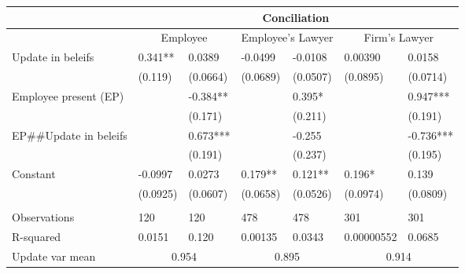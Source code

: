 \begin{tabular}{lcccccc}
      & \multicolumn{6}{c}{Conciliation } \\
\midrule
      & \multicolumn{2}{c}{Employee} & \multicolumn{2}{c}{Employee's Lawyer} & \multicolumn{2}{c}{Firm's Lawyer} \\
\midrule
\midrule
Update in beleifs & \multicolumn{1}{l}{0.341**} & \multicolumn{1}{l}{0.0389} & \multicolumn{1}{l}{-0.0499} & \multicolumn{1}{l}{-0.0108} & \multicolumn{1}{l}{0.00390} & \multicolumn{1}{l}{0.0158} \\
      & \multicolumn{1}{l}{(0.119)} & \multicolumn{1}{l}{(0.0664)} & \multicolumn{1}{l}{(0.0689)} & \multicolumn{1}{l}{(0.0507)} & \multicolumn{1}{l}{(0.0895)} & \multicolumn{1}{l}{(0.0714)} \\
Employee present (EP) & \multicolumn{1}{l}{} & \multicolumn{1}{l}{-0.384**} & \multicolumn{1}{l}{} & \multicolumn{1}{l}{0.395*} & \multicolumn{1}{l}{} & \multicolumn{1}{l}{0.947***} \\
      & \multicolumn{1}{l}{} & \multicolumn{1}{l}{(0.171)} & \multicolumn{1}{l}{} & \multicolumn{1}{l}{(0.211)} & \multicolumn{1}{l}{} & \multicolumn{1}{l}{(0.191)} \\
EP\#\#Update in beleifs & \multicolumn{1}{l}{} & \multicolumn{1}{l}{0.673***} & \multicolumn{1}{l}{} & \multicolumn{1}{l}{-0.255} & \multicolumn{1}{l}{} & \multicolumn{1}{l}{-0.736***} \\
      & \multicolumn{1}{l}{} & \multicolumn{1}{l}{(0.191)} & \multicolumn{1}{l}{} & \multicolumn{1}{l}{(0.237)} & \multicolumn{1}{l}{} & \multicolumn{1}{l}{(0.195)} \\
Constant  & \multicolumn{1}{l}{-0.0997} & \multicolumn{1}{l}{0.0273} & \multicolumn{1}{l}{0.179**} & \multicolumn{1}{l}{0.121**} & \multicolumn{1}{l}{0.196*} & \multicolumn{1}{l}{0.139} \\
      & \multicolumn{1}{l}{(0.0925)} & \multicolumn{1}{l}{(0.0607)} & \multicolumn{1}{l}{(0.0658)} & \multicolumn{1}{l}{(0.0526)} & \multicolumn{1}{l}{(0.0974)} & \multicolumn{1}{l}{(0.0809)} \\
      &       &       &       &       &       &  \\
\midrule
Observations & \multicolumn{1}{l}{120} & \multicolumn{1}{l}{120} & \multicolumn{1}{l}{478} & \multicolumn{1}{l}{478} & \multicolumn{1}{l}{301} & \multicolumn{1}{l}{301} \\
R-squared & \multicolumn{1}{l}{0.0151} & \multicolumn{1}{l}{0.120} & \multicolumn{1}{l}{0.00135} & \multicolumn{1}{l}{0.0343} & \multicolumn{1}{l}{0.00000552} & \multicolumn{1}{l}{0.0685} \\
Update var mean & \multicolumn{2}{c}{0.954} & \multicolumn{2}{c}{0.895} & \multicolumn{2}{c}{0.914} \\
\bottomrule
\bottomrule
\end{tabular}%

